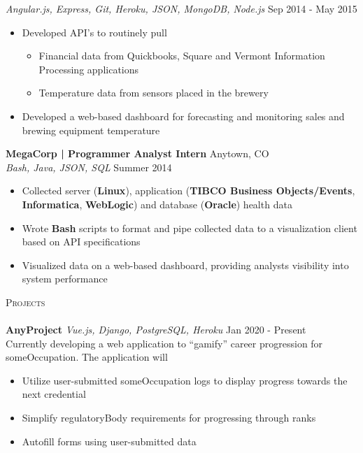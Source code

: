 \documentclass[a4paper]{article}
\newcommand{\lineunder} {
    \vspace*{-8pt} \\
    \hspace*{-18pt} \hrulefill \\
}
\newcommand{\header} [1] {
    {\hspace*{-18pt}\vspace*{6pt} \textsc{#1}}
    \vspace*{-6pt} \lineunder
}
\begin{document}
\textsl{Angular.js, Express, Git, Heroku, JSON, MongoDB, Node.js} \hfill Sep 2014 - May 2015\\
\vspace{-1mm}
\begin{itemize} \itemsep 1pt
	\item  Developed API’s to routinely pull 
	\begin{itemize} \itemsep 1pt
		\item Financial data from Quickbooks, Square and Vermont Information Processing applications 
		\item Temperature data from sensors placed in the brewery
	\end{itemize}
	\item  Developed a web-based dashboard for forecasting and monitoring sales and brewing equipment temperature
\end{itemize}
\textbf{MegaCorp | Programmer Analyst Intern} \hfill Anytown, CO\\
\textsl{Bash, Java, JSON, SQL} \hfill Summer 2014\\
\vspace{-1mm}
\begin{itemize} \itemsep 1pt
	\item  Collected server (\textbf{Linux}), application (\textbf{TIBCO Business Objects/Events}, \textbf{Informatica}, \textbf{WebLogic}) and database (\textbf{Oracle}) health data
	\item  Wrote \textbf{Bash} scripts to format and pipe collected data to a visualization client based on API specifications
	\item  Visualized data on a web-based dashboard, providing analysts visibility into system performance
\end{itemize}



\header{Projects}
\textbf{AnyProject} \hfill
\textsl{Vue.js, Django, PostgreSQL, Heroku} \hfill Jan 2020 - Present\\
\vspace{2mm}
Currently developing a web application to “gamify” career progression for someOccupation. The application will 
\begin{itemize} \itemsep 1pt
	\item  Utilize user-submitted someOccupation logs to display progress towards the next credential 
	\item  Simplify regulatoryBody requirements for progressing through ranks 
	\item Autofill forms using user-submitted data
\end{itemize}
\vspace*{2mm}



\ 
\end{document}
